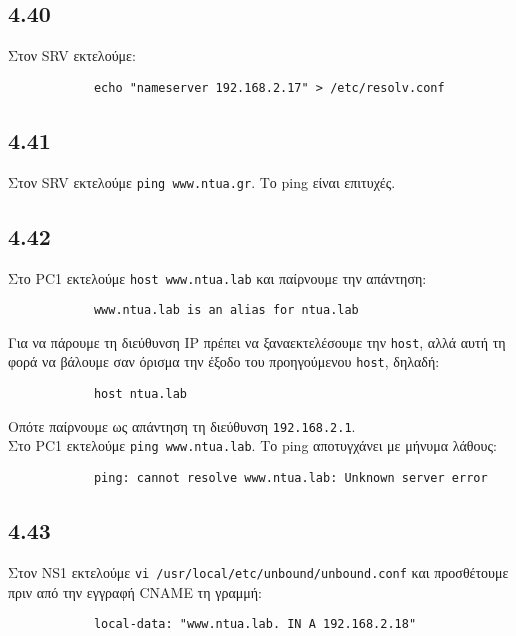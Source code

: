 \documentclass[a4paper, 12pt]{article}
\begin{document}
	\subsection*{4.40}
		Στον SRV εκτελούμε:
		
		\begin{verbatim}
			echo "nameserver 192.168.2.17" > /etc/resolv.conf
		\end{verbatim}

	\subsection*{4.41}
		Στον SRV εκτελούμε \verb|ping www.ntua.gr|. Το ping είναι επιτυχές.

	\subsection*{4.42}
		Στο PC1 εκτελούμε \verb|host www.ntua.lab| και παίρνουμε την απάντηση:
		
		\begin{verbatim}
			www.ntua.lab is an alias for ntua.lab
		\end{verbatim}
		
		Για να πάρουμε τη διεύθυνση IP πρέπει να ξαναεκτελέσουμε την \verb|host|, αλλά αυτή τη φορά να βάλουμε σαν όρισμα την έξοδο του προηγούμενου \verb|host|, δηλαδή:
		
		\begin{verbatim}
			host ntua.lab
		\end{verbatim}
		
		Οπότε παίρνουμε ως απάντηση τη διεύθυνση \verb|192.168.2.1|. \\
		
		Στο PC1 εκτελούμε \verb|ping www.ntua.lab|. Το ping αποτυγχάνει με μήνυμα λάθους:
		
		\begin{verbatim}
			ping: cannot resolve www.ntua.lab: Unknown server error
		\end{verbatim}

	\subsection*{4.43}
		Στον NS1 εκτελούμε \verb|vi /usr/local/etc/unbound/unbound.conf| και προσθέτουμε πριν από την εγγραφή CNAME τη γραμμή:
		
		\begin{verbatim}
			local-data: "www.ntua.lab. IN A 192.168.2.18"
		\end{verbatim}
		
\end{document}
